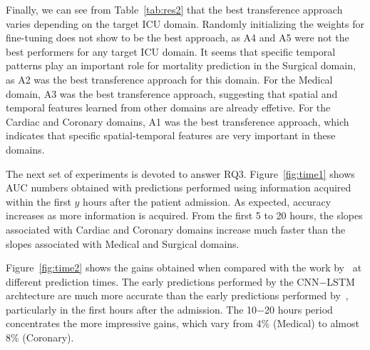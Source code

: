 Finally, we can see from Table~\ref{tab:res2} that the best transference approach varies depending on the target ICU domain. Randomly initializing the weights for fine-tuning does not show to be the best approach, as A4 and A5 were not the best performers for any target ICU domain. It seems that specific temporal patterns play an important role for mortality prediction in the Surgical domain, as A2 was the best transference approach for this domain. For the Medical domain, A3 was the best transference approach, suggesting that spatial and temporal features learned from other domains are already effetive. For the Cardiac and Coronary domains, A1 was the best transference approach, which indicates that specific spatial-temporal features are very important in these domains.

The next set of experiments is devoted to answer RQ3. Figure~\ref{fig:time1} shows AUC numbers obtained with predictions performed using information acquired within the first $y$ hours after the patient admission. As expected, accuracy increases as more information is acquired. From the first 5 to 20 hours, the slopes associated with Cardiac and Coronary domains increase much faster than the slopes associated with Medical and Surgical domains. 

Figure~\ref{fig:time2} shows the gains obtained when compared with the work by~\citet{kdd} at different prediction times. The early predictions performed by the CNN$-$LSTM archtecture are much more accurate than the early predictions performed by~\citet{kdd}, particularly in the first hours after the admission. The 10$-$20 hours period concentrates the more impressive gains, which vary from 4\% (Medical) to almost 8\% (Coronary).

